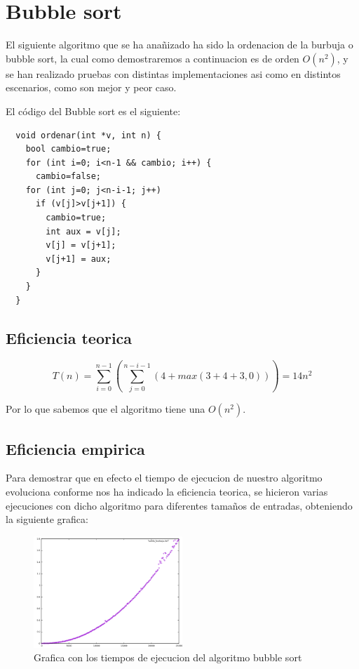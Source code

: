\section{Bubble sort}
El siguiente algoritmo que se ha anañizado ha sido la ordenacion de la burbuja o bubble sort, la cual como demostraremos a continuacion es de orden $O(n^{2})$, y se han realizado pruebas con distintas implementaciones asi como en distintos escenarios, como son mejor y peor caso.

El código del Bubble sort es el siguiente:

\begin{lstlisting}
  void ordenar(int *v, int n) {
    bool cambio=true;
    for (int i=0; i<n-1 && cambio; i++) {
      cambio=false;
    for (int j=0; j<n-i-1; j++)
      if (v[j]>v[j+1]) {
        cambio=true;
        int aux = v[j];
        v[j] = v[j+1];
        v[j+1] = aux;
      }
    }
  }
\end{lstlisting}

\subsection{Eficiencia teorica}

\begin{equation}
  T(n)=\sum_{i=0}^{n-1}(\sum_{j=0}^{n-i-1}(4+max(3+4+3,0)))=14n^{2}
\end{equation}

Por lo que sabemos que el algoritmo tiene una $O(n^{2})$.


\subsection{Eficiencia empirica}
Para demostrar que en efecto el tiempo de ejecucion de nuestro algoritmo evoluciona conforme nos ha indicado la eficiencia teorica, se hicieron varias ejecuciones con dicho algoritmo para diferentes tamaños de entradas, obteniendo la siguiente grafica:

\begin{figure}[H]
  \centering
  \includegraphics[width=0.5\textwidth]{./Imagenes/burbuja_pela.png}
  \caption{Grafica con los tiempos de ejecucion del algoritmo bubble sort}
\end{figure}


